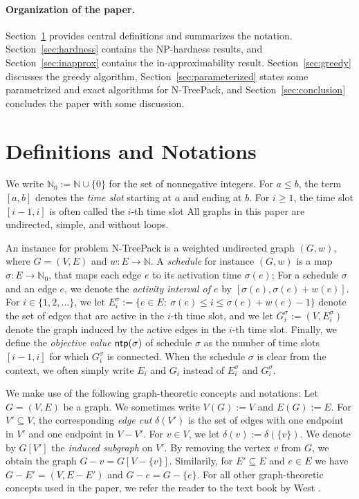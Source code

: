 \documentclass[runningheads]{llncs}
\newcommand{\N}{\mathbb{N}}
\newcommand{\set}[1]{\{ #1 \}}
\DeclareMathOperator{\ntp}{\text{\sf ntp}}
\newcommand{\xxxNTP}{{\sc N-TreePack}}
\begin{document}
\paragraph{Organization of the paper.}
Section~\ref{sec:notation} provides central definitions and summarizes the notation.
Section~\ref{sec:hardness} contains the NP-hardness results, and 
Section~\ref{sec:inapprox} contains the in-approximability result.
Section~\ref{sec:greedy} discusses the greedy algorithm, 
Section~\ref{sec:parameterized} states some parametrized and exact algorithms for {\xxxNTP}, and
Section~\ref{sec:conclusion} concludes the paper with some discussion.


\section{Definitions and Notations}
\label{sec:notation}
We write $\N_0 := \N \cup \set{0}$ for the set of nonnegative integers. 
For $a\le b$, the term $[a,b]$ denotes the \emph{time slot} starting at $a$ and ending at $b$. 
For $i\ge1$, the time slot $[i-1,i]$ is often called the $i$-th time slot 
All graphs in this paper are undirected, simple, and without loops.

An instance for problem {\xxxNTP} is a weighted undirected graph $(G,w)$, where $G=(V,E)$ and $w:E\to\N$. 
A \emph{schedule} for instance $(G,w)$ is a map $\sigma:E\to\N_0$, that maps each edge $e$ to its activation time $\sigma(e)$;
For a schedule $\sigma$ and an edge $e$, we denote the \emph{activity interval of $e$} by $[\sigma(e),\sigma(e)+w(e)]$. 
For $i\in\{1,2,\ldots\}$, we let $E^\sigma_i:= \set{e\in E:~ \sigma(e)\le i\le \sigma(e)+w(e)-1}$ denote 
the set of edges that are active in the $i$-th time slot, and we let $G^\sigma_i:= (V, E^\sigma_i)$ denote 
the graph induced by the active edges in the $i$-th time slot. 
Finally, we define the \emph{objective value} $\ntp(\sigma)$ of schedule $\sigma$ as the number of time 
slots $[i-1,i]$ for which $G^\sigma_i$ is connected. 
When the schedule $\sigma$ is clear from the context, we often simply write $E_i$ and $G_i$ instead of 
$E^\sigma_i$ and $G^\sigma_i$. 

We make use of the following graph-theoretic concepts and notations: 
Let $G=(V,E)$ be a graph. We sometimes write $V(G):=V$ and $E(G):=E$. 
For $V'\subseteq V$, the corresponding \emph{edge cut} $\delta(V')$ is the set of edges with
one endpoint in $V'$ and one endpoint in $V-V'$. 
For $v\in V$, we let $\delta(v) := \delta(\set{v})$. 
We denote by $G[V']$ the \emph{induced subgraph} on $V'$. 
By removing the vertex $v$ from $G$, we obtain the graph $G-v=G[V-\set{v}]$. 
Similarily, for $E'\subseteq E$ and $e\in E$ we have $G-E'=(V,E-E')$ and $G-e=G-\set{e}$.
For all other graph-theoretic concepts used in the paper, we refer the reader to the
text book by West \cite{WestBook}.
\end{document}
